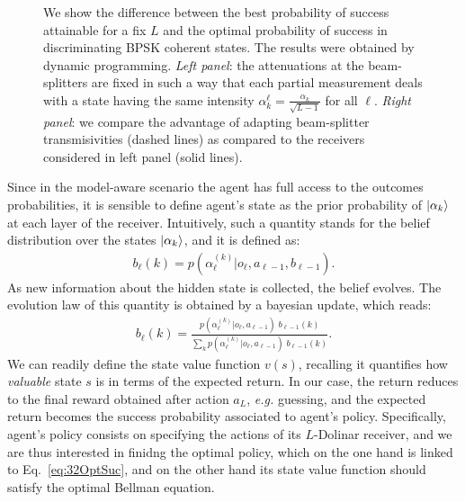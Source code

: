 \begin{figure}[t!]
\begin{subfigure}[b]{0.49\textwidth}
        \caption{}
        \label{fig:dpre2}
    \end{subfigure}
    \caption{We show the difference between the best probability of success attainable for a fix $L$ and the optimal probability of success in discriminating BPSK coherent states. The results were obtained by dynamic programming. \textit{Left panel}: the attenuations at the beam-splitters are fixed in such a way that each partial measurement deals with a state having the same intensity $\alpha^{\ell}_k=\frac{\alpha_k}{\sqrt{L-1}}$ for all $\ell$. \textit{Right panel}: we compare the advantage of adapting beam-splitter transmisivities (dashed lines) as compared to the receivers considered in left panel (solid lines).}
    \label{fig:dp_resu}
\end{figure}

Since in the model-aware scenario the agent has full access to the outcomes probabilities, it is sensible to define agent's state as the prior probability of $\ket{\alpha_k}$ at each layer of the receiver. Intuitively, such a quantity stands for the belief distribution over the states $\ket{\alpha_k}$, and it is defined as:
\begin{align}\label{eq:belief}
b_{\ell}(k) = p(\alpha^{(k)}_{\ell}|o_{\ell},a_{\ell-1},b_{\ell-1}).
\end{align}
As new information about the hidden state is collected, the belief evolves. The evolution law of this quantity is obtained by a bayesian update, which reads:
\begin{eqnarray}\label{eq:belUp}
b_{\ell}(k) = \frac{p(\alpha^{(k)}_{\ell}|o_{\ell}, a_{\ell-1}) \;b_{\ell-1}(k)}{\sum_{k} p(\alpha^{(k)}_{\ell}|o_{\ell}, a_{\ell-1}) \; b_{\ell-1}(k)}.
\end{eqnarray}
We can readily define the state value function $v(s)$, recalling it quantifies how \textit{valuable} state $s$ is in terms of the expected return. In our case, the return reduces to the final reward obtained after action $a_L$, \textit{e.g.} guessing, and the expected return becomes the success probability associated to agent's policy. Specifically, agent's policy consists on specifying the actions of its $L$-Dolinar receiver, and we are thus interested in finidng the optimal policy, which on the one hand is linked to Eq.~\ref{eq:32OptSuc}, and on the other hand its state value function should satisfy the optimal Bellman equation.%

